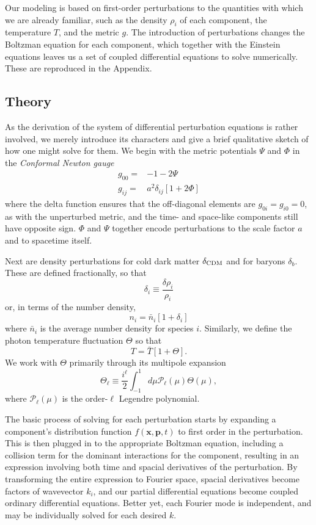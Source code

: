 \documentclass[aps,prl,twocolumn,groupedaddress,nofootinbib]{revtex4-2}
\begin{document}
Our modeling is based on first-order perturbations to the quantities with which we are already familiar, such as the density $\rho_i$ of each component, the temperature $T$, and the metric $g$. The introduction of perturbations changes the Boltzman equation for each component, which together with the Einstein equations leaves us a set of coupled differential equations to solve numerically. These are reproduced in the Appendix.
\subsection{Theory}
As the derivation of the system of differential perturbation equations is rather involved, we merely introduce its characters and give a brief qualitative sketch of how one might solve for them. We begin with the metric potentials $\Psi$ and $\Phi$ in the \textit{Conformal Newton gauge}
\begin{align*}
    g_{00} = & -1-2\Psi                \\
    g_{ij} = & a^2\delta_{ij}[1+2\Phi]
\end{align*}
where the delta function ensures that the off-diagonal elements are $g_{0i}=g_{i0}=0$, as with the unperturbed metric, and the time- and space-like components still have opposite sign. $\Phi$ and $\Psi$ together encode perturbations to the scale factor $a$ and to spacetime itself.

Next are density perturbations for cold dark matter $\delta_{\rm{CDM}}$ and  for baryons $\delta_b$. These are defined fractionally, so that
\begin{equation*}
    \delta_i\equiv\frac{\delta\rho_i}{\rho_i}
\end{equation*}
or, in terms of the number density,
\begin{equation*}
    n_i=\bar{n}_i[1+\delta_i]
\end{equation*}
where $\bar n_i$ is the average number density for species $i$. Similarly, we define the photon temperature fluctuation $\Theta$ so that
\begin{equation*}
    T=\bar T[1+\Theta].
\end{equation*}
We work with $\Theta$ primarily through its multipole expansion
\begin{equation*}
    \Theta_\ell\equiv\frac{i^\ell}{2}\int_{-1}^{1}d\mu\mathcal{P}_\ell(\mu)\Theta(\mu),
\end{equation*}
where $\mathcal{P}_\ell(\mu)$ is the order-$\ell$ Legendre polynomial.

The basic process of solving for each perturbation starts by expanding a component's distribution function $f(\mathbf{x}, \mathbf{p}, t)$ to first order in the perturbation. This is then plugged in to the appropriate Boltzman equation, including a collision term for the dominant interactions for the component, resulting in an expression involving both  time and spacial derivatives of the perturbation. By transforming the entire expression to Fourier space, spacial derivatives become factors of wavevector $k_i$, and our partial differential equations become coupled ordinary differential equations. Better yet, each Fourier mode is independent, and may be individually solved for each desired $k$.
\end{document}
